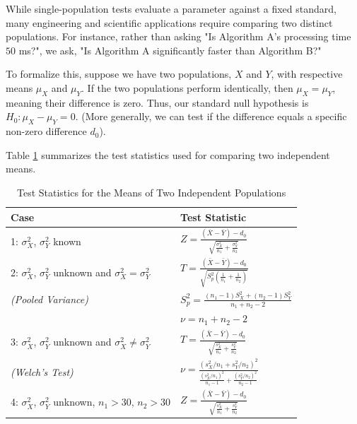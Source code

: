 \documentclass{article}
\begin{document}
While single-population tests evaluate a parameter against a fixed standard, many engineering and scientific applications require comparing two distinct populations. For instance, rather than asking "Is Algorithm A's processing time $50$ ms?", we ask, "Is Algorithm A significantly faster than Algorithm B?"

To formalize this, suppose we have two populations, $X$ and $Y$, with respective means $\mu_X$ and $\mu_Y$. If the two populations perform identically, then $\mu_X = \mu_Y$, meaning their difference is zero. Thus, our standard null hypothesis is $H_0: \mu_X - \mu_Y = 0$. (More generally, we can test if the difference equals a specific non-zero difference $d_0$).

Table \ref{tab:meantests2} summarizes the test statistics used for comparing two independent means.

\begin{table}[h]
\centering
\bgroup
\def\arraystretch{2.0}
\begin{tabular}{ll}
\hline
\textbf{Case} & \textbf{Test Statistic} \\ \hline
1: $\sigma^2_X$, $\sigma^2_Y$ known & $Z = \frac{(\bar{X} - \bar{Y}) - d_0}{\sqrt{\frac{\sigma^2_X}{n_1} + \frac{\sigma^2_Y}{n_2}}}$ \\
2: $\sigma^2_X$, $\sigma^2_Y$ unknown and $\sigma^2_X = \sigma^2_Y$ & $T = \frac{(\bar{X} - \bar{Y}) - d_0}{\sqrt{S^2_p \left(\frac{1}{n_1} + \frac{1}{n_2}\right)}}$ \\
\emph{(Pooled Variance)} & $S^2_p = \frac{(n_1 - 1)S^2_X + (n_2 - 1)S^2_Y}{n_1 + n_2 - 2}$ \\
& $\nu = n_1 + n_2 - 2$ \\
3: $\sigma^2_X$, $\sigma^2_Y$ unknown and $\sigma^2_X \neq \sigma^2_Y$ & $T = \frac{(\bar{X} - \bar{Y}) - d_0}{\sqrt{\frac{s^2_X}{n_1} + \frac{s^2_Y}{n_2}}}$ \\
\emph{(Welch's Test)} & $\nu = \frac{(s^2_X / n_1 + s^2_Y / n_2)^2}{\frac{(s^2_X/n_1)^2}{n_1 - 1} + \frac{(s^2_Y/n_2)^2}{n_2 - 1}}$ \\ 
4: $\sigma^2_X$, $\sigma^2_Y$ unknown, $n_1 > 30$, $n_2 > 30$ & $Z = \frac{(\bar{X} - \bar{Y}) - d_0}{\sqrt{\frac{s^2_X}{n_1} + \frac{s^2_Y}{n_2}}}$ \\ \hline \hline
\end{tabular}
\egroup
\caption{\label{tab:meantests2} Test Statistics for the Means of Two Independent Populations}
\end{table}
\end{document}
